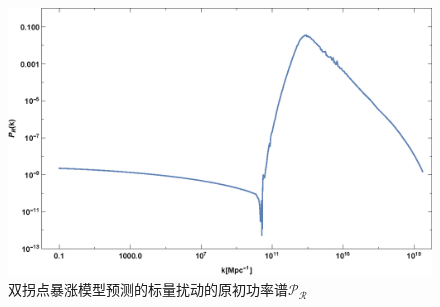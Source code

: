 \begin{figure}[!htbp]
    \centering
    \includegraphics[width=5in]{Img/pert.eps}
    \caption{双拐点暴涨模型预测的标量扰动的原初功率谱$\mathcal{P_R}$}\label{fig:pert}
\end{figure}
